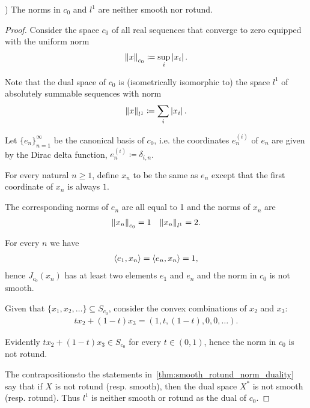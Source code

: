 \begin{example}\label{thm:c0_l1_not_smooth_rotund}\cite[exercise 2.37(c]{Phelps1993})
  The norms in $c_0$ and $l^1$ are neither smooth nor rotund.
\end{example}
\begin{proof}
  Consider the space $c_0$ of all real sequences that converge to zero equipped with the uniform norm
  \begin{align*}
    \left\Vert x \right\Vert_{c_0} \coloneqq \sup_i \left\vert x_i \right\vert.
  \end{align*}

  Note that the dual space of $c_0$ is (isometrically isomorphic to) the space $l^1$ of absolutely summable sequences with norm
  \begin{align*}
    \left\Vert x \right\Vert_{l^1} \coloneqq \sum_i \left\vert x_i \right\vert.
  \end{align*}

  Let $\{ e_n \}_{n=1}^\infty$ be the canonical basis of $c_0$, i.e. the coordinates $e^{(i)}_n$ of $e_n$ are given by the Dirac delta function, $e^{(i)}_n \coloneqq \delta_{i,n}$.

  For every natural $n \geq 1$, define $x_n$ to be the same as $e_n$ except that the first coordinate of $x_n$ is always $1$.

  The corresponding norms of $e_n$ are all equal to 1 and the norms of $x_n$ are
  \begin{align*}
    \left\Vert x_n \right\Vert_{c_0} = 1
    &&
    \left\Vert x_n \right\Vert_{l^1} = 2.
  \end{align*}

  For every $n$ we have
  \begin{align*}
    \left\langle e_1, x_n \right\rangle = \left\langle e_n, x_n \right\rangle = 1,
  \end{align*}
  hence $J_{c_0}(x_n)$ has at least two elements $e_1$ and $e_n$ and the norm in $c_0$ is not smooth.

  Given that $\{ x_1, x_2, \ldots \} \subseteq S_{c_0}$, consider the convex combinations of $x_2$ and $x_3$:
  \begin{align*}
    tx_2 + (1-t)x_3
    =
    (1, t, (1-t), 0, 0, \ldots).
  \end{align*}

  Evidently $tx_2 + (1-t)x_3 \in S_{c_0}$ for every $t \in (0, 1)$, hence the norm in $c_0$ is not rotund.

  The contrapositions\LEM to the statements in~\cref{thm:smooth_rotund_norm_duality} say that if $X$ is not rotund (resp. smooth), then the dual space $X^*$ is not smooth (resp. rotund). Thus $l^1$ is neither smooth or rotund as the dual of $c_0$.
\end{proof}
